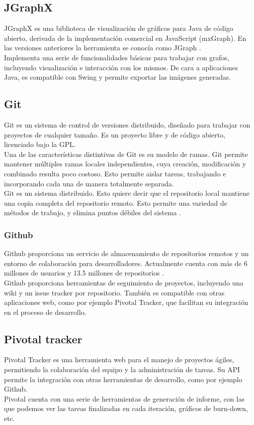 \subsection{JGraphX}

JGraphX es una biblioteca de visualización de gráficos para Java de código abierto, derivada de la implementación comercial en JavaScript (mxGraph).
En las versiones anteriores la herramienta se conocía como JGraph \cite{website:jgraphx}.
\\
Implementa una serie de funcionalidades básicas para trabajar con grafos, incluyendo visualización e interacción con los mismos.
De cara a aplicaciones Java, es compatible con Swing y permite exportar las imágenes generadas.

\subsection{Git}

Git es un sistema de control de versiones distribuido, diseñado para trabajar con proyectos de cualquier tamaño.
Es un proyecto libre y de código abierto, licenciado bajo la GPL.
\\
Una de las características distintivas de Git es su modelo de ramas.
Git permite mantener múltiples ramas locales independientes, cuya creación, modificación y combinado resulta poco costoso.
Esto permite aislar tareas, trabajando e incorporando cada una de manera totalmente separada.
\\
Git es un sistema distribuido.
Esto quiere decir que el repositorio local mantiene una copia completa del repositorio remoto.
Esto permite una variedad de métodos de trabajo, y elimina puntos débiles del sistema \cite{website:git}.

\subsubsection{Github}

Github proporciona un servicio de almacenamiento de repositorios remotos y un entorno de colaboración para desarrolladores.
Actualmente cuenta con más de 6 millones de usuarios y 13.5 millones de repositorios \cite{website:github}.
\\
Github proporciona herramientas de seguimiento de proyectos, incluyendo una wiki y un issue tracker por repositorio.
También es compatible con otras aplicaciones web, como por ejemplo Pivotal Tracker, que facilitan su integración en el proceso de desarrollo.

\subsection{Pivotal tracker}

Pivotal Tracker es una herramienta web para el manejo de proyectos ágiles, permitiendo la colaboración del equipo y la administración de tareas.
Su API permite la integración con otras herramientas de desarrollo, como por ejemplo Github.
\\
Pivotal cuenta con una serie de herramientas de generación de informe, con las que podemos ver las tareas finalizadas en cada iteración, gráficos de burn-down, etc.